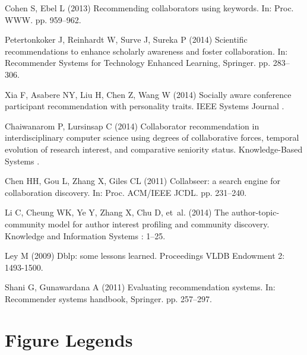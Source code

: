 \documentclass[10pt]{article}
\begin{document}
\begin{thebibliography}{10}
Cohen S, Ebel L (2013) Recommending collaborators using keywords.
\newblock In: Proc. WWW. pp. 959--962.

Petertonkoker J, Reinhardt W, Surve J, Sureka P (2014) Scientific
  recommendations to enhance scholarly awareness and foster collaboration.
\newblock In: Recommender Systems for Technology Enhanced Learning, Springer.
  pp. 283--306.

Xia F, Asabere NY, Liu H, Chen Z, Wang W (2014) Socially aware conference
  participant recommendation with personality traits.
\newblock IEEE Systems Journal .

Chaiwanarom P, Lursinsap C (2014) Collaborator recommendation in
  interdisciplinary computer science using degrees of collaborative forces,
  temporal evolution of research interest, and comparative seniority status.
\newblock Knowledge-Based Systems .

Chen HH, Gou L, Zhang X, Giles CL (2011) Collabseer: a search engine for
  collaboration discovery.
\newblock In: Proc. ACM/IEEE JCDL. pp. 231--240.

Li C, Cheung WK, Ye Y, Zhang X, Chu D, et~al. (2014) The author-topic-community
  model for author interest profiling and community discovery.
\newblock Knowledge and Information Systems : 1--25.

Ley M (2009) Dblp: some lessons learned.
\newblock Proceedings VLDB Endowment 2: 1493-1500.

Shani G, Gunawardana A (2011) Evaluating recommendation systems.
\newblock In: Recommender systems handbook, Springer. pp. 257--297.

\end{thebibliography}


%

\section*{Figure Legends}
%
\end{document}
